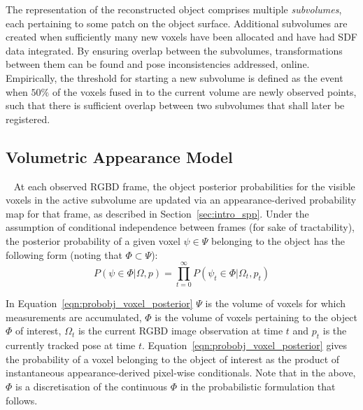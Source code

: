 The representation of the reconstructed object comprises multiple \textit{subvolumes}, 
each pertaining to some patch on the object surface. Additional subvolumes are created 
when sufficiently many new voxels have been allocated and have had SDF data integrated. 
By ensuring overlap between the subvolumes, transformations between them can be found and 
pose inconsistencies addressed, online. Empirically, the threshold for starting a new
subvolume is defined as the event when \( 50\% \) of the voxels fused in to the
current volume are newly observed points, such that there is sufficient overlap 
between two subvolumes that shall later be registered.

\subsection{Volumetric Appearance Model}
~\label{subsec:probobj_vol_appearance_model}
At each observed RGBD frame, the object posterior probabilities for the visible
voxels in the active subvolume are updated via an appearance-derived probability
map for that frame, as described in Section~\ref{sec:intro_spp}. Under the assumption 
of conditional independence between frames (for sake of tractability), the posterior 
probability of a given voxel \( \psi \in \Psi \) belonging to the object has the following 
form (noting that \( \Phi \subset \Psi \)):
\begin{equation}
\label{eqn:probobj_voxel_posterior}
P(\psi \in \Phi | \Omega, p) = \prod_{t=0}^{\infty}
P(\psi_{t} \in \Phi | \Omega_{t}, p_{t})
\end{equation}

In Equation~\ref{eqn:probobj_voxel_posterior} \( \Psi \) is the volume of 
voxels for which measurements are accumulated, \( \Phi \)  is the volume of voxels 
pertaining to the object \(\Phi\) of interest, \(\Omega_{t}\) is the current 
RGBD image observation at time \(t\) and \(p_{t}\) is the currently tracked pose at 
time \(t\). Equation~\ref{eqn:probobj_voxel_posterior} gives the probability of 
a voxel belonging to the object of interest as the product of instantaneous appearance-derived 
pixel-wise conditionals. Note that in the above, \( \Phi \) is a discretisation of 
the continuous \( \Phi \) in the probabilistic formulation that follows.

